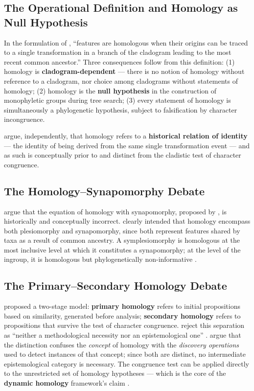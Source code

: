 \subsection{The Operational Definition and Homology as Null Hypothesis}

In the formulation of \textcite[p.~10]{wheeleretal2006}, ``features are homologous when their origins can be traced to a single transformation in a branch of the cladogram leading to the most recent common ancestor.'' Three consequences follow from this definition: (1) homology is \textbf{cladogram-dependent} --- there is no notion of homology without reference to a cladogram, nor choice among cladograms without statements of homology; (2) homology is the \textbf{null hypothesis} in the construction of monophyletic groups during tree search; (3) every statement of homology is simultaneously a phylogenetic hypothesis, subject to falsification by character incongruence.

\textcite{grant2004ts} argue, independently, that homology refers to a \textbf{historical relation of identity} --- the identity of being derived from the same single transformation event --- and as such is conceptually prior to and distinct from the cladistic test of character congruence.

\subsection{The Homology--Synapomorphy Debate}

\textcite{nixon2012} argue that the equation of homology with synapomorphy, proposed by \textcite{patterson1982}, is historically and conceptually incorrect. \textcite{hennig1966} clearly intended that homology encompass both plesiomorphy and synapomorphy, since both represent features shared by taxa as a result of common ancestry. A symplesiomorphy is homologous at the most inclusive level at which it constitutes a synapomorphy; at the level of the ingroup, it is homologous but phylogenetically non-informative \parencite{nixon2012}.

\subsection{The Primary--Secondary Homology Debate}

\textcite{depinna1991} proposed a two-stage model: \textbf{primary homology} refers to initial propositions based on similarity, generated before analysis; \textbf{secondary homology} refers to propositions that survive the test of character congruence. \textcite{wheeleretal2006} reject this separation as ``neither a methodological necessity nor an epistemological one'' \parencite[p.~10]{wheeleretal2006}. \textcite{grant2004ts} argue that the distinction confuses the \textit{concept} of homology with the \textit{discovery operations} used to detect instances of that concept; since both are distinct, no intermediate epistemological category is necessary. The congruence test can be applied directly to the unrestricted set of homology hypotheses --- which is the core of the \textbf{dynamic homology} framework's claim \parencite{wheeler2001a,wheeler2001b}.

